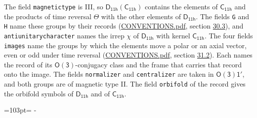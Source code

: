 \documentclass[10pt,a4paper]{article}
\newcommand{\needspace}[1]{\par\penalty-100\begingroup\dimen0=#1\relax\dimen2=\pagegoal
  \advance\dimen2-\pagetotal\ifdim\dimen0>\dimen2\relax\ifdim\dimen2>0pt\vfil\break\fi\fi
  \endgroup}
\numberwithin{equation}{section}
\newcommand{\grp}[1]{\mathsf{#1}}
\begin{document}
The field \texttt{magnetictype} is III, so $\grp{D_{11h}}(\grp{C_{11h}})$ contains the elements of $\grp{C_{11h}}$ and the products of time reversal $\varTheta$ with the other elements of $\grp{D_{11h}}$. The fields \texttt{G} and \texttt{H} name these groups by their records (\href{../../CONVENTIONS.pdf}{CONVENTIONS.pdf}, section \href{../../CONVENTIONS.pdf\#conv.30.3}{30.3}), and \texttt{antiunitarycharacter} names the irrep $\chi$ of $\grp{D_{11h}}$ with kernel $\grp{C_{11h}}$. The four fields \texttt{images} name the groups by which the elements move a polar or an axial vector, even or odd under time reversal (\href{../../CONVENTIONS.pdf}{CONVENTIONS.pdf}, section \href{../../CONVENTIONS.pdf\#conv.31.2}{31.2}). Each names the record of its $\grp{O(3)}$-conjugacy class and the frame that carries that record onto the image. The fields \texttt{normalizer} and \texttt{centralizer} are taken in $\grp{O(3)1'}$, and both groups are of magnetic type II. The field \texttt{orbifold} of the record gives the orbifold symbols of $\grp{D_{11h}}$ and of $\grp{C_{11h}}$.
\needspace{103pt}
\end{document}
